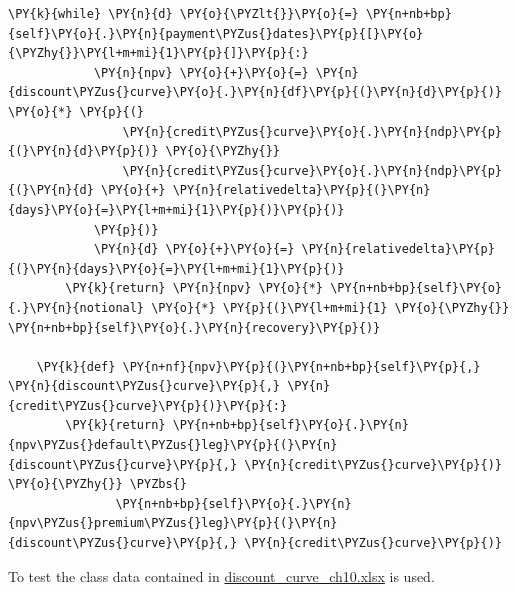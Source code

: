 \begin{tcolorbox}[breakable, size=fbox, boxrule=1pt, pad at break*=1mm,colback=cellbackground, colframe=cellborder]
\begin{Verbatim}[commandchars=\\\{\}]
        \PY{k}{while} \PY{n}{d} \PY{o}{\PYZlt{}}\PY{o}{=} \PY{n+nb+bp}{self}\PY{o}{.}\PY{n}{payment\PYZus{}dates}\PY{p}{[}\PY{o}{\PYZhy{}}\PY{l+m+mi}{1}\PY{p}{]}\PY{p}{:}
            \PY{n}{npv} \PY{o}{+}\PY{o}{=} \PY{n}{discount\PYZus{}curve}\PY{o}{.}\PY{n}{df}\PY{p}{(}\PY{n}{d}\PY{p}{)} \PY{o}{*} \PY{p}{(}
                \PY{n}{credit\PYZus{}curve}\PY{o}{.}\PY{n}{ndp}\PY{p}{(}\PY{n}{d}\PY{p}{)} \PY{o}{\PYZhy{}}
                \PY{n}{credit\PYZus{}curve}\PY{o}{.}\PY{n}{ndp}\PY{p}{(}\PY{n}{d} \PY{o}{+} \PY{n}{relativedelta}\PY{p}{(}\PY{n}{days}\PY{o}{=}\PY{l+m+mi}{1}\PY{p}{)}\PY{p}{)}
            \PY{p}{)}
            \PY{n}{d} \PY{o}{+}\PY{o}{=} \PY{n}{relativedelta}\PY{p}{(}\PY{n}{days}\PY{o}{=}\PY{l+m+mi}{1}\PY{p}{)}
        \PY{k}{return} \PY{n}{npv} \PY{o}{*} \PY{n+nb+bp}{self}\PY{o}{.}\PY{n}{notional} \PY{o}{*} \PY{p}{(}\PY{l+m+mi}{1} \PY{o}{\PYZhy{}} \PY{n+nb+bp}{self}\PY{o}{.}\PY{n}{recovery}\PY{p}{)}
    
    \PY{k}{def} \PY{n+nf}{npv}\PY{p}{(}\PY{n+nb+bp}{self}\PY{p}{,} \PY{n}{discount\PYZus{}curve}\PY{p}{,} \PY{n}{credit\PYZus{}curve}\PY{p}{)}\PY{p}{:}
        \PY{k}{return} \PY{n+nb+bp}{self}\PY{o}{.}\PY{n}{npv\PYZus{}default\PYZus{}leg}\PY{p}{(}\PY{n}{discount\PYZus{}curve}\PY{p}{,} \PY{n}{credit\PYZus{}curve}\PY{p}{)} \PY{o}{\PYZhy{}} \PYZbs{}
               \PY{n+nb+bp}{self}\PY{o}{.}\PY{n}{npv\PYZus{}premium\PYZus{}leg}\PY{p}{(}\PY{n}{discount\PYZus{}curve}\PY{p}{,} \PY{n}{credit\PYZus{}curve}\PY{p}{)}
\end{Verbatim}
\end{tcolorbox}    

To test the class data contained in \href{https://drive.google.com/file/d/1mugHyet3H9tcSAvYvt8G4_kpfaEbVY7b/view?usp=sharing}{discount\_curve\_ch10.xlsx} is used.

